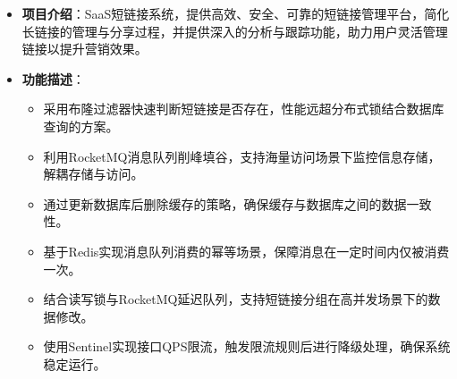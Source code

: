 \documentclass{../../styles/resume}
\begin{document}
\begin{itemize}[leftmargin=*, labelsep=0.5em]
  \item \textbf{项目介绍}：SaaS短链接系统，提供高效、安全、可靠的短链接管理平台，简化长链接的管理与分享过程，并提供深入的分析与跟踪功能，助力用户灵活管理链接以提升营销效果。
  \item \textbf{功能描述}：
    \begin{itemize}
      \item 采用布隆过滤器快速判断短链接是否存在，性能远超分布式锁结合数据库查询的方案。
      \item 利用RocketMQ消息队列削峰填谷，支持海量访问场景下监控信息存储，解耦存储与访问。
      \item 通过更新数据库后删除缓存的策略，确保缓存与数据库之间的数据一致性。
      \item 基于Redis实现消息队列消费的幂等场景，保障消息在一定时间内仅被消费一次。
      \item 结合读写锁与RocketMQ延迟队列，支持短链接分组在高并发场景下的数据修改。
      \item 使用Sentinel实现接口QPS限流，触发限流规则后进行降级处理，确保系统稳定运行。
    \end{itemize}
\end{itemize}
\end{document}
